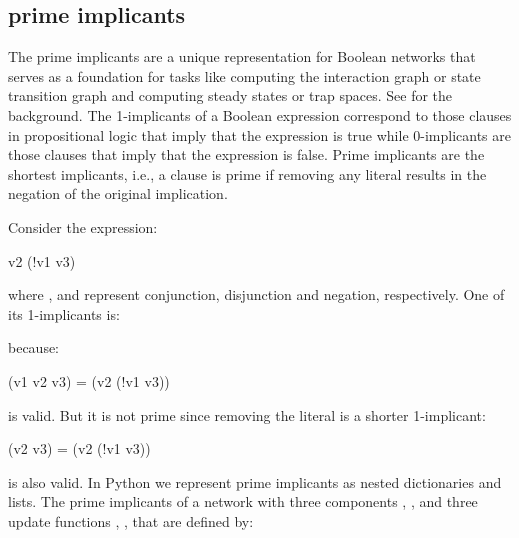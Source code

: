 \documentclass[letterpaper,10pt,english]{sphinxmanual}
\begin{document}
\subsection{prime implicants}
\label{\detokenize{Manual:prime-implicants}}
The prime implicants are a unique representation for Boolean networks that serves as a foundation for tasks
like computing the interaction graph or state transition graph and computing steady states or trap spaces.
See {\hyperref[\detokenize{Bibliography:klarner2015trap}]{}} for the background.
The 1-implicants of a Boolean expression correspond to those clauses in propositional logic
that imply that the expression is true while 0-implicants are those clauses that imply that the expression is false.
Prime implicants are the shortest implicants, i.e.,
a clause is prime if removing any literal results in the negation of the original implication.

Consider the expression:

\begin{sphinxVerbatim}[commandchars=\\\{\}]
v2 \PYGZam{} (!v1 \textbar{} v3)
\end{sphinxVerbatim}

where \sphinxcode{\&}, \sphinxcode{\textbar{}} and \sphinxcode{!} represent conjunction, disjunction and negation, respectively.
One of its 1-implicants is:

\begin{sphinxVerbatim}[commandchars=\\\{\}]
    
\end{sphinxVerbatim}

because:

\begin{sphinxVerbatim}[commandchars=\\\{\}]
(v1 \PYGZam{} v2 \PYGZam{} v3) =\PYGZgt{} (v2 \PYGZam{} (!v1 \textbar{} v3))
\end{sphinxVerbatim}

is valid.
But it is not prime since removing the literal  is a shorter 1-implicant:

\begin{sphinxVerbatim}[commandchars=\\\{\}]
(v2 \PYGZam{} v3) =\PYGZgt{} (v2 \PYGZam{} (!v1 \textbar{} v3))
\end{sphinxVerbatim}

is also valid. In Python we represent prime implicants as nested dictionaries and lists.
The prime implicants of a network with three components , ,  and three update functions , ,  that are defined by:
\end{document}

